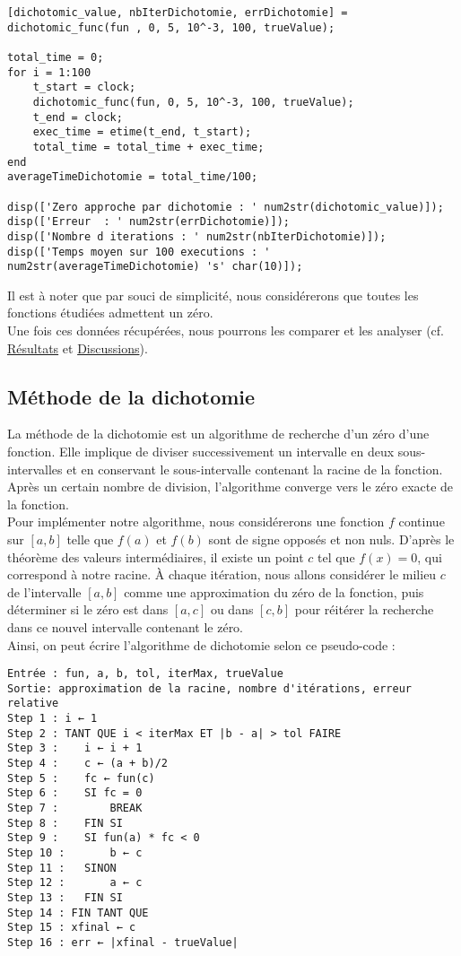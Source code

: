 \documentclass[12pt]{article}
\begin{document}
\begin{lstlisting}[caption={Récupération des données d'une méthode}]
[dichotomic_value, nbIterDichotomie, errDichotomie] = dichotomic_func(fun , 0, 5, 10^-3, 100, trueValue);

total_time = 0;
for i = 1:100
    t_start = clock;
    dichotomic_func(fun, 0, 5, 10^-3, 100, trueValue);
    t_end = clock;
    exec_time = etime(t_end, t_start);
    total_time = total_time + exec_time;
end
averageTimeDichotomie = total_time/100;

disp(['Zero approche par dichotomie : ' num2str(dichotomic_value)]);
disp(['Erreur  : ' num2str(errDichotomie)]);
disp(['Nombre d iterations : ' num2str(nbIterDichotomie)]);
disp(['Temps moyen sur 100 executions : ' num2str(averageTimeDichotomie) 's' char(10)]);
\end{lstlisting}
Il est à noter que par souci de simplicité, nous considérerons que toutes les fonctions étudiées admettent un zéro.\\
Une fois ces données récupérées, nous pourrons les comparer et les analyser (cf. \hyperref[ref:resultats]{Résultats} et \hyperref[ref:discussions]{Discussions}).\\


\subsection{Méthode de la dichotomie}
\label{ref:dichotomie}
\noindent La méthode de la dichotomie est un algorithme de recherche d'un zéro d'une fonction. Elle implique de diviser successivement un intervalle en deux sous-intervalles et en conservant le sous-intervalle contenant la racine de la fonction. Après un certain nombre de division, l'algorithme converge vers le zéro exacte de la fonction.\\
Pour implémenter notre algorithme, nous considérerons une fonction $f$ continue sur $[a,b]$ telle que $f(a)$ et $f(b)$ sont de signe opposés et non nuls. D'après le théorème des valeurs intermédiaires, il existe un point $c$ tel que $f(x) = 0$, qui correspond à notre racine. À chaque itération, nous allons considérer le milieu $c$ de l'intervalle $[a,b]$ comme une approximation du zéro de la fonction, puis déterminer si le zéro est dans $[a,c]$ ou dans $[c,b]$ pour réitérer la recherche dans ce nouvel intervalle contenant le zéro.\\
Ainsi, on peut écrire l'algorithme de dichotomie selon ce pseudo-code :
\begin{verbatim}
Entrée : fun, a, b, tol, iterMax, trueValue
Sortie: approximation de la racine, nombre d'itérations, erreur relative
Step 1 : i ← 1
Step 2 : TANT QUE i < iterMax ET |b - a| > tol FAIRE
Step 3 :    i ← i + 1
Step 4 :    c ← (a + b)/2
Step 5 :    fc ← fun(c)
Step 6 :    SI fc = 0
Step 7 :        BREAK
Step 8 :    FIN SI
Step 9 :    SI fun(a) * fc < 0
Step 10 :       b ← c
Step 11 :   SINON
Step 12 :       a ← c
Step 13 :   FIN SI
Step 14 : FIN TANT QUE
Step 15 : xfinal ← c
Step 16 : err ← |xfinal - trueValue|
\end{verbatim}
\end{document}
